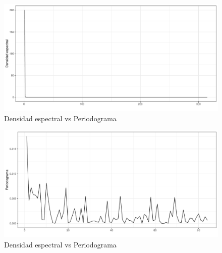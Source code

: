 \documentclass[
  letterpaper,
  DIV=11,
  numbers=noendperiod,
  twocolumn]{scrartcl}
\begin{document}
\begin{figure}[H]

{\centering \includegraphics{pdf_tarea2_files/figure-pdf/fig-exp10-1.pdf}

}

\caption{\label{fig-exp10-1}Densidad espectral vs Periodograma}

\end{figure}

\begin{figure}[H]

{\centering \includegraphics{pdf_tarea2_files/figure-pdf/fig-exp10-2.pdf}

}

\caption{\label{fig-exp10-2}Densidad espectral vs Periodograma}

\end{figure}
\end{document}
